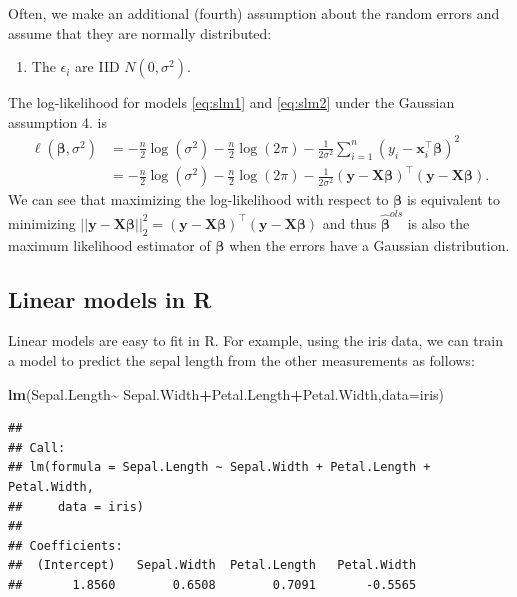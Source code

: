 \documentclass[
]{book}
\newenvironment{Shaded}{\begin{snugshade}}{\end{snugshade}}
\newcommand{\AttributeTok}[1]{\textcolor[rgb]{0.13,0.29,0.53}{#1}}
\newcommand{\FunctionTok}[1]{\textcolor[rgb]{0.13,0.29,0.53}{\textbf{#1}}}
\newcommand{\NormalTok}[1]{#1}
\newcommand{\SpecialCharTok}[1]{\textcolor[rgb]{0.81,0.36,0.00}{\textbf{#1}}}
\providecommand{\tightlist}{%
  \setlength{\itemsep}{0pt}\setlength{\parskip}{0pt}}
\theoremstyle{definition}
\theoremstyle{definition}
\theoremstyle{definition}
\theoremstyle{definition}
\theoremstyle{remark}
\begin{document}
Often, we make an additional (fourth) assumption about the random errors and assume that they are normally distributed:

\begin{enumerate}
\def\labelenumi{\arabic{enumi}.}
\setcounter{enumi}{3}
\tightlist
\item
  The \(\epsilon_i\) are IID \(N(0, \sigma^2)\).
\end{enumerate}

The log-likelihood for models \eqref{eq:slm1} and \eqref{eq:slm2} under the Gaussian assumption 4. is
\begin{align*}
\ell(\boldsymbol \beta, \sigma^2)&=-\frac{n}{2}\log (\sigma^2)-\frac{n}{2}\log(2\pi)-\frac{1}{2\sigma^2} \sum_{i=1}^n (y_i-\mathbf x_i^\top \boldsymbol \beta)^2\\
& = -\frac{n}{2}\log (\sigma^2)-\frac{n}{2}\log(2\pi)-\frac{1}{2\sigma^2} (\mathbf y- \mathbf X\boldsymbol \beta)^\top (\mathbf y- \mathbf X\boldsymbol \beta).
\end{align*}
We can see that maximizing the log-likelihood with respect to \(\boldsymbol \beta\) is equivalent to minimizing \(||\mathbf y- \mathbf X\boldsymbol \beta||_2^2=(\mathbf y- \mathbf X\boldsymbol \beta)^\top (\mathbf y- \mathbf X\boldsymbol \beta)\)
and thus \(\hat{\boldsymbol \beta}^{ols}\) is also the maximum likelihood estimator of \(\boldsymbol \beta\) when the errors have a Gaussian distribution.

\hypertarget{linear-models-in-r}{%
\subsection{Linear models in R}\label{linear-models-in-r}}

Linear models are easy to fit in R. For example, using the iris data, we can train a model to predict the sepal length from the other measurements as follows:

\begin{Shaded}
\begin{Highlighting}[]
\FunctionTok{lm}\NormalTok{(Sepal.Length}\SpecialCharTok{\textasciitilde{}}\NormalTok{ Sepal.Width}\SpecialCharTok{+}\NormalTok{Petal.Length}\SpecialCharTok{+}\NormalTok{Petal.Width,}\AttributeTok{data=}\NormalTok{iris)}
\end{Highlighting}
\end{Shaded}

\begin{verbatim}
## 
## Call:
## lm(formula = Sepal.Length ~ Sepal.Width + Petal.Length + Petal.Width, 
##     data = iris)
## 
## Coefficients:
##  (Intercept)   Sepal.Width  Petal.Length   Petal.Width  
##       1.8560        0.6508        0.7091       -0.5565
\end{verbatim}
\end{document}
